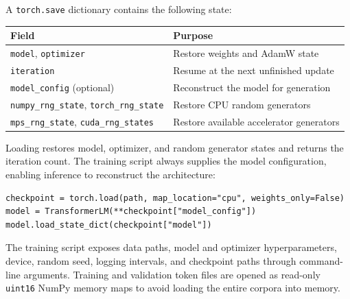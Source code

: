 A \texttt{torch.save} dictionary contains
the following state:
\begin{center}
\begin{tabular}{ll}
\toprule
Field & Purpose \\
\midrule
\texttt{model}, \texttt{optimizer} & Restore weights and AdamW state \\
\texttt{iteration} & Resume at the next unfinished update \\
\texttt{model\_config} (optional) & Reconstruct the model for generation \\
\texttt{numpy\_rng\_state}, \texttt{torch\_rng\_state} & Restore CPU random generators \\
\texttt{mps\_rng\_state}, \texttt{cuda\_rng\_states} & Restore available accelerator generators \\
\bottomrule
\end{tabular}
\end{center}
Loading restores model, optimizer, and random generator states and returns
the iteration count. The training script always supplies the model
configuration, enabling inference to reconstruct the architecture:
\par\noindent
\begin{minipage}{\linewidth}
\begin{lstlisting}[caption={Reconstructing a model from a training checkpoint}]
checkpoint = torch.load(path, map_location="cpu", weights_only=False)
model = TransformerLM(**checkpoint["model_config"])
model.load_state_dict(checkpoint["model"])
\end{lstlisting}
\end{minipage}\par




The training script exposes data paths,
model and optimizer hyperparameters, device, random seed, logging intervals,
and checkpoint paths through command-line arguments. Training and validation
token files are opened as read-only \texttt{uint16} NumPy memory maps to
avoid loading the entire corpora into memory.

